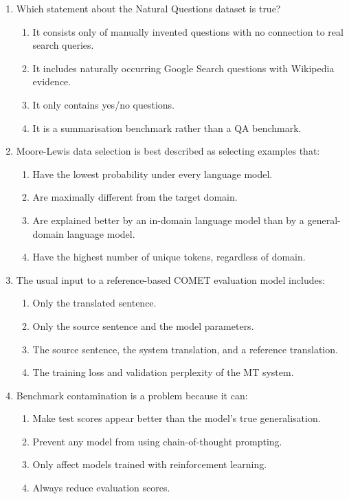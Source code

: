 \documentclass[11pt,a4paper]{article}
\begin{document}
\begin{enumerate}[leftmargin=*]
\begin{enumerate}
\item Which statement about the Natural Questions dataset is true?
\begin{enumerate}[label=\Alph*.]
\item It consists only of manually invented questions with no connection to real search queries.
\item It includes naturally occurring Google Search questions with Wikipedia evidence.
\item It only contains yes/no questions.
\item It is a summarisation benchmark rather than a QA benchmark.
\end{enumerate}

\item Moore-Lewis data selection is best described as selecting examples that:
\begin{enumerate}[label=\Alph*.]
\item Have the lowest probability under every language model.
\item Are maximally different from the target domain.
\item Are explained better by an in-domain language model than by a general-domain language model.
\item Have the highest number of unique tokens, regardless of domain.
\end{enumerate}

\item The usual input to a reference-based COMET evaluation model includes:
\begin{enumerate}[label=\Alph*.]
\item Only the translated sentence.
\item Only the source sentence and the model parameters.
\item The source sentence, the system translation, and a reference translation.
\item The training loss and validation perplexity of the MT system.
\end{enumerate}

\item Benchmark contamination is a problem because it can:
\begin{enumerate}[label=\Alph*.]
\item Make test scores appear better than the model's true generalisation.
\item Prevent any model from using chain-of-thought prompting.
\item Only affect models trained with reinforcement learning.
\item Always reduce evaluation scores.
\end{enumerate}


\end{enumerate}
\end{enumerate}
\end{document}
